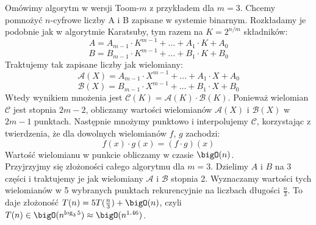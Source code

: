 Omówimy algorytm w wersji Toom-\(m\) z przykładem dla \( m = 3 \). Chcemy pomnożyć \(n\)-cyfrowe liczby A i B zapisane w systemie binarnym.
Rozkładamy je podobnie jak w algorytmie Karatsuby, tym razem na \( K = 2^{n / m} \) składników:
\[
    A = A_{m-1} \cdot K^{m-1} + \dots + A_1 \cdot K + A_0
\]
\[
    B = B_{m-1} \cdot K^{m-1} + \dots + B_1 \cdot K + B_0
\]
Traktujemy tak zapisane liczby jak wielomiany:
\[
    \mathcal{A}(X) = A_{m-1} \cdot X^{m-1} + \dots + A_1 \cdot X + A_0
\]
\[
    \mathcal{B}(X) = B_{m-1} \cdot X^{m-1} + \dots + B_1 \cdot X + B_0
\]
Wtedy wynikiem mnożenia jest \( \mathcal{C}(K) = \mathcal{A}(K) \cdot \mathcal{B}(K) \). Ponieważ wielomian \( \mathcal{C} \) jest stopnia \( 2m-2 \), obliczamy wartości wielomianów \( \mathcal{A}(X) \) i \( \mathcal{B}(X) \) w \( 2m-1 \) punktach.
Następnie mnożymy punktowo i interpolujemy \( \mathcal{C} \), korzystając z twierdzenia, że dla dowolnych wielomianów \( f \), \( g \) zachodzi:
\[
    f(x) \cdot g(x) = (f \cdot g)(x)
\]
Wartość wielomianu w punkcie obliczamy w czasie \( \bigO(n) \). \\
Przyjrzyjmy się złożoności całego algorytmu dla \( m = 3 \). Dzielimy \( A \) i \( B \) na 3 części i traktujemy je jak wielomiany \( \mathcal{A} \) i \( \mathcal{B} \) stopnia 2. Wyznaczamy wartości tych wielomianów w 5 wybranych punktach rekurencyjnie na liczbach długości \( \frac{n}{3} \). To daje złożoność \( T(n) = 5T(\frac{n}{3}) + \bigO(n) \), czyli \( T(n) \in \bigO(n^{\log_3 5}) \approx \bigO(n^{1.46}) \).